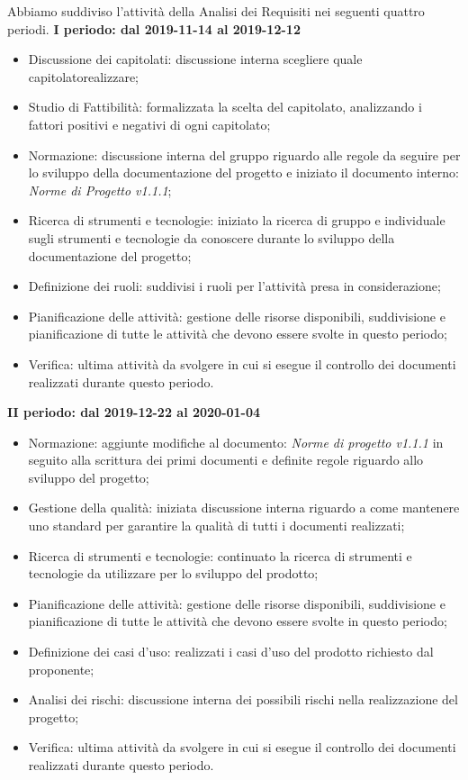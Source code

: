 Abbiamo suddiviso l'attività della Analisi dei Requisiti nei seguenti quattro periodi.
\textbf{I periodo: dal 2019-11-14 al 2019-12-12}
\begin{itemize}
	\item Discussione dei capitolati: discussione interna scegliere quale capitolato\glosp realizzare;
	\item Studio di Fattibilità: formalizzata la scelta del capitolato\glo , analizzando i fattori positivi e negativi di ogni capitolato\glo ;
	\item Normazione: discussione interna del gruppo riguardo alle regole da seguire per lo sviluppo della documentazione del progetto e iniziato il documento interno: \textit{Norme di Progetto v1.1.1};
	\item Ricerca di strumenti e tecnologie: iniziato la ricerca di gruppo e individuale sugli strumenti e tecnologie da conoscere durante lo sviluppo della documentazione del progetto;
	\item Definizione dei ruoli: suddivisi i ruoli per l'attività presa in considerazione; 
	\item Pianificazione delle attività: gestione delle risorse disponibili, suddivisione e pianificazione di tutte le attività che devono essere svolte in questo periodo;
	\item Verifica: ultima attività da svolgere in cui si esegue il controllo dei documenti realizzati durante questo periodo.
\end{itemize}

\textbf{II periodo: dal 2019-12-22 al 2020-01-04}
\begin{itemize}
	\item Normazione: aggiunte modifiche al documento: \textit{Norme di progetto v1.1.1} in seguito alla scrittura dei primi documenti e definite regole riguardo allo sviluppo del progetto;
	\item Gestione della qualità: iniziata discussione interna riguardo a come mantenere uno standard per garantire la qualità di tutti i documenti realizzati;
	\item Ricerca di strumenti e tecnologie: continuato la ricerca di strumenti e tecnologie da utilizzare per lo sviluppo del prodotto;
	\item Pianificazione delle attività: gestione delle risorse disponibili, suddivisione e pianificazione di tutte le attività che devono essere svolte in questo periodo;
	\item Definizione dei casi d'uso: realizzati i casi d'uso del prodotto richiesto dal proponente;
	\item Analisi dei rischi: discussione interna dei possibili rischi nella realizzazione del progetto;
	\item Verifica: ultima attività da svolgere in cui si esegue il controllo dei documenti realizzati durante questo periodo.
\end{itemize}

